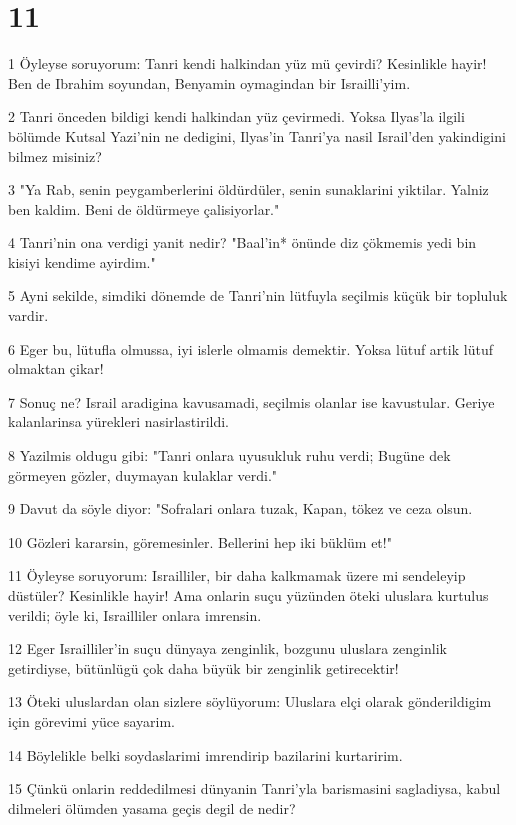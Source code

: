 \chapter{11}

\par 1 Öyleyse soruyorum: Tanri kendi halkindan yüz mü çevirdi? Kesinlikle hayir! Ben de Ibrahim soyundan, Benyamin oymagindan bir Israilli'yim.
\par 2 Tanri önceden bildigi kendi halkindan yüz çevirmedi. Yoksa Ilyas'la ilgili bölümde Kutsal Yazi'nin ne dedigini, Ilyas'in Tanri'ya nasil Israil'den yakindigini bilmez misiniz?
\par 3 "Ya Rab, senin peygamberlerini öldürdüler, senin sunaklarini yiktilar. Yalniz ben kaldim. Beni de öldürmeye çalisiyorlar."
\par 4 Tanri'nin ona verdigi yanit nedir? "Baal'in* önünde diz çökmemis yedi bin kisiyi kendime ayirdim."
\par 5 Ayni sekilde, simdiki dönemde de Tanri'nin lütfuyla seçilmis küçük bir topluluk vardir.
\par 6 Eger bu, lütufla olmussa, iyi islerle olmamis demektir. Yoksa lütuf artik lütuf olmaktan çikar!
\par 7 Sonuç ne? Israil aradigina kavusamadi, seçilmis olanlar ise kavustular. Geriye kalanlarinsa yürekleri nasirlastirildi.
\par 8 Yazilmis oldugu gibi: "Tanri onlara uyusukluk ruhu verdi; Bugüne dek görmeyen gözler, duymayan kulaklar verdi."
\par 9 Davut da söyle diyor: "Sofralari onlara tuzak, Kapan, tökez ve ceza olsun.
\par 10 Gözleri kararsin, göremesinler. Bellerini hep iki büklüm et!"
\par 11 Öyleyse soruyorum: Israilliler, bir daha kalkmamak üzere mi sendeleyip düstüler? Kesinlikle hayir! Ama onlarin suçu yüzünden öteki uluslara kurtulus verildi; öyle ki, Israilliler onlara imrensin.
\par 12 Eger Israilliler'in suçu dünyaya zenginlik, bozgunu uluslara zenginlik getirdiyse, bütünlügü çok daha büyük bir zenginlik getirecektir!
\par 13 Öteki uluslardan olan sizlere söylüyorum: Uluslara elçi olarak gönderildigim için görevimi yüce sayarim.
\par 14 Böylelikle belki soydaslarimi imrendirip bazilarini kurtaririm.
\par 15 Çünkü onlarin reddedilmesi dünyanin Tanri'yla barismasini sagladiysa, kabul dilmeleri ölümden yasama geçis degil de nedir?
